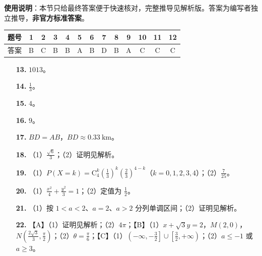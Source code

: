 
\begin{gknotice}
\textbf{使用说明}：本节只给最终答案便于快速核对，完整推导见解析版。答案为编写者独立推导，\textbf{非官方标准答案}。
\end{gknotice}

\begin{center}\begin{tabular}{ccccccccccccc}
\toprule
题号 & 1 & 2 & 3 & 4 & 5 & 6 & 7 & 8 & 9 & 10 & 11 & 12 \\
\midrule
答案 & B & C & B & B & A & B & D & B & A & C & C & C \\
\bottomrule
\end{tabular}\end{center}

\begin{itemize}[leftmargin=2.6em]
  \item[\textbf{13.}] $1013$。
  \item[\textbf{14.}] $\frac13$。
  \item[\textbf{15.}] $4$。
  \item[\textbf{16.}] $9$。
\end{itemize}

\begin{itemize}[leftmargin=2.6em]
  \item[\textbf{17.}] $BD=AB$，$BD\approx0.33\ \mathrm{km}$。
  \item[\textbf{18.}] （1）$\frac{\sqrt6}{3}$；（2）证明见解析。
  \item[\textbf{19.}] （1）$P(X=k)=\mathrm C_4^k\left(\frac13\right)^k\left(\frac23\right)^{4-k}$（$k=0,1,2,3,4$）；（2）$\frac7{25}$。
  \item[\textbf{20.}] （1）$\frac{x^2}{4}+\frac{y^2}{3}=1$；（2）定值为 $\frac12$。
  \item[\textbf{21.}] （1）按 $1<a<2$、$a=2$、$a>2$ 分列单调区间；（2）证明见解析。
  \item[\textbf{22.}] 【A】（1）证明见解析；（2）$4\pi$；【B】（1）$x+\sqrt3y=2$，$M(2,0)$，$N\left(\frac{2\sqrt3}{3},\frac\pi2\right)$；（2）$\theta=\frac\pi6$；【C】（1）$\left(-\infty,-\frac32\right]\cup\left[\frac32,+\infty\right)$；（2）$a\leqslant-1$ 或 $a\geqslant3$。
\end{itemize}
